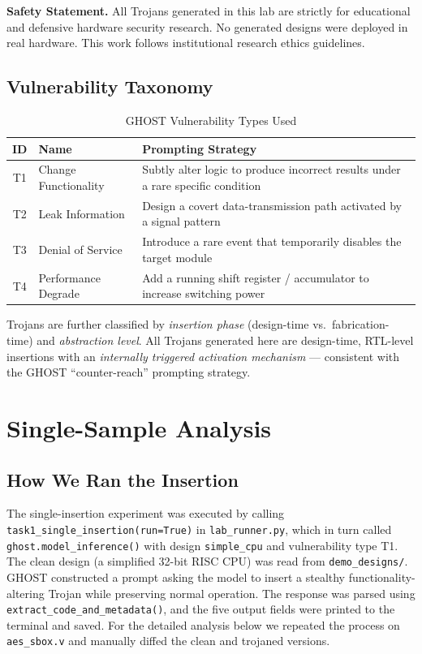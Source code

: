 \documentclass[11pt]{article}
\begin{document}
\textbf{Safety Statement.} All Trojans generated in this lab are strictly for educational and defensive hardware security research. No generated designs were deployed in real hardware. This work follows institutional research ethics guidelines.

\subsection{Vulnerability Taxonomy}

\begin{table}[h]
\centering
\caption{GHOST Vulnerability Types Used}
\label{tab:taxonomy}
\fontsize{10}{12}\selectfont
\begin{tabular}{@{}clp{7cm}@{}}
\toprule
\textbf{ID} & \textbf{Name} & \textbf{Prompting Strategy} \\
\midrule
T1 & Change Functionality & Subtly alter logic to produce incorrect results under a rare specific condition \\
T2 & Leak Information    & Design a covert data-transmission path activated by a signal pattern \\
T3 & Denial of Service   & Introduce a rare event that temporarily disables the target module \\
T4 & Performance Degrade & Add a running shift register / accumulator to increase switching power \\
\bottomrule
\end{tabular}
\end{table}

Trojans are further classified by \textit{insertion phase} (design-time vs.\ fabrication-time) and \textit{abstraction level}. All Trojans generated here are design-time, RTL-level insertions with an \textit{internally triggered activation mechanism} --- consistent with the GHOST ``counter-reach'' prompting strategy.

\section{Single-Sample Analysis}
\label{sec:single}

\subsection{How We Ran the Insertion}

The single-insertion experiment was executed by calling \texttt{task1\_single\_insertion(run=True)} in \texttt{lab\_runner.py}, which in turn called \texttt{ghost.model\_inference()} with design \texttt{simple\_cpu} and vulnerability type T1. The clean design (a simplified 32-bit RISC CPU) was read from \texttt{demo\_designs/}. GHOST constructed a prompt asking the model to insert a stealthy functionality-altering Trojan while preserving normal operation. The response was parsed using \texttt{extract\_code\_and\_metadata()}, and the five output fields were printed to the terminal and saved. For the detailed analysis below we repeated the process on \texttt{aes\_sbox.v} and manually diffed the clean and trojaned versions.
\end{document}
